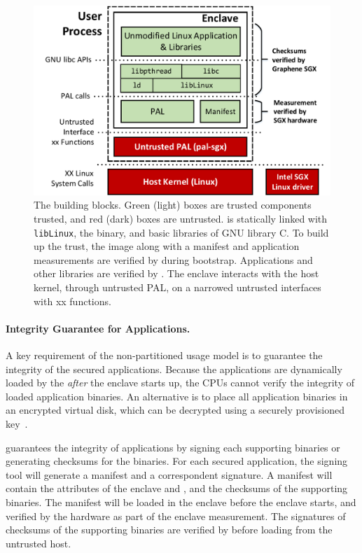 \begin{figure}[t!]
\centering
\includegraphics[width=4.5in]{graphene-sgx/figures/architecture.pdf}
\footnotesize
\caption[\sysname{}: building blocks]
{The \sysname{} building blocks.
Green (light) boxes are trusted components trusted,
and red (dark) boxes are untrusted.
\sysname{} is statically linked with {\tt libLinux},
the \libos{} binary, and basic libraries of GNU library C.
To build up the trust, the \sysname{} image along with
a manifest and application measurements
are verified by \sgx{} during bootstrap. Applications and other libraries
are verified by \sysname{}. The enclave interacts with the host kernel,
through untrusted PAL, on a narrowed untrusted interfaces with xx functions.}
\label{fig:gsgx:arch}
\end{figure}

\paragraph{Integrity Guarantee for Applications.}
A key requirement of the non-partitioned usage model is to guarantee the integrity of the secured applications.
Because the applications are dynamically loaded by the \libos{}
{\em after} the enclave starts up,
the CPUs cannot verify the integrity of loaded application binaries.
An alternative is to place all application binaries in an encrypted virtual disk,
which can be decrypted using a securely provisioned key~\citep{baumann14haven}.

\sysname{} guarantees the integrity of applications
by signing each supporting binaries or generating checksums for the binaries.
For each secured application, the \sysname{} signing tool will generate
a manifest and a correspondent signature.
A manifest will contain the attributes of the enclave and \libos{},
and the checksums of the supporting binaries.
The manifest will be loaded in the enclave before the enclave starts,
and verified by the hardware as part of the enclave measurement.
The signatures of checksums of the supporting binaries
are verified by \sysname{} before loading from the untrusted host.

